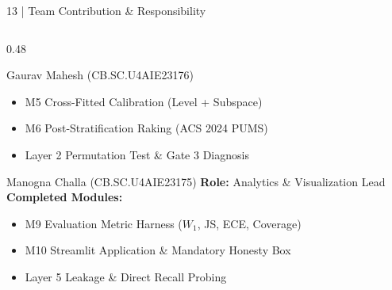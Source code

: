 \documentclass[10pt,aspectratio=169]{beamer}
\begin{document}
\begin{frame}{13 | Team Contribution \& Responsibility}
\begin{columns}[T]
\begin{column}{0.48\textwidth}
\begin{block}{Gaurav Mahesh (CB.SC.U4AIE23176)}
                \begin{itemize}\itemsep1pt
                    \item M5 Cross-Fitted Calibration (Level + Subspace)
                    \item M6 Post-Stratification Raking (ACS 2024 PUMS)
                    \item Layer 2 Permutation Test \& Gate 3 Diagnosis
                \end{itemize}
            \end{block}
            \vspace{0.1cm}
            \begin{block}{Manogna Challa (CB.SC.U4AIE23175)}
                \scriptsize
                \textbf{Role:} Analytics \& Visualization Lead \\
                \textbf{Completed Modules:}
                \begin{itemize}\itemsep1pt
                    \item M9 Evaluation Metric Harness ($W_1$, JS, ECE, Coverage)
                    \item M10 Streamlit Application \& Mandatory Honesty Box
                    \item Layer 5 Leakage \& Direct Recall Probing
                \end{itemize}
            \end{block}
        \end{column}
    \end{columns}
\end{frame}
\end{document}
